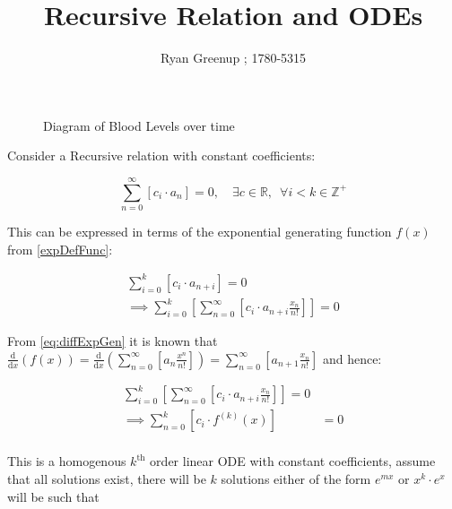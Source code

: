 \documentclass[12 pt]{article}
\title{\color{coltit} \Huge Recursive Relation and ODEs}
\author{Ryan Greenup ; 1780-5315}
\begin{document}
\maketitle
\tableofcontents

\begin{figure}[h!]
  \caption{Diagram of Blood Levels over time}
  \label{fig:Concentration Plot}
\end{figure}

Consider a Recursive relation with constant coefficients:

$$
\sum^{\infty}_{n= 0}   \left[ c_i \cdot  a_n \right] = 0, \quad \exists c \in
\mathbb{R}, \enspace \forall i<k\in\mathbb{Z}^+
$$

This can be expressed in terms of the exponential generating function $f\left( x \right)$ from \eqref{expDefFunc}:

$$\begin{aligned}
    \sum^{k}_{i= 0}   \left[ c_i \cdot  a_{n+i} \right] = 0 \\
\implies \sum^{k}_{i= 0}   \left[\sum^{\infty}_{n= 0}   \left[ c_i \cdot
a_{n+i} \frac{x_n}{n!}  \right]   \right] = 0
\end{aligned}$$

From \eqref{eq:diffExpGen} it is known that $\frac{\mathrm{d} }{\mathrm{d} x}\left( f\left( x \right) \right)= \frac{\mathrm{d} }{\mathrm{d} x}\left( \sum^{\infty}_{n= 0}   \left[ a_n \frac{x^n}{n!} \right]  \right) = \sum^{\infty}_{n= 0} \left[ a_{n+  1} \frac{x_n}{n!} \right]$ and hence:

$$\begin{aligned}
\sum^{k}_{i= 0}   \left[\sum^{\infty}_{n= 0}   \left[ c_i \cdot
a_{n+i} \frac{x_n}{n!}  \right]   \right] = 0 \\
 \implies  \sum^{k}_{n= 0}   \left[c_i  \cdot   f^{\left( k \right)}\left( x \right) \right] &=  0 \\
\end{aligned}$$

This is a homogenous $k^{\mathrm{th}}$ order linear ODE with constant coefficients, assume that all solutions exist, there will be $k$ solutions either of the form $e^{mx}$ or $x^k \cdot  e^x$  will be such that 

 
\end{document}
